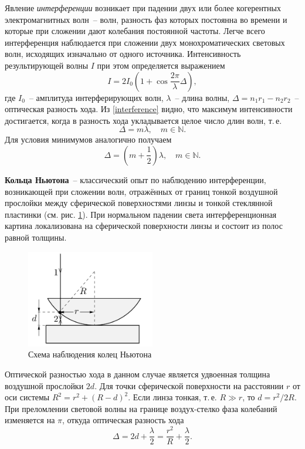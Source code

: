 \documentclass[a4paper,12pt]{article} %
\begin{document}
Явление \textit{интерференции} возникает при падении двух или более когерентных электромагнитных волн~-- волн, разность фаз которых постоянна во времени и которые при сложении дают колебания постоянной частоты. Легче всего интерференция наблюдается при сложении двух монохроматических световых волн, исходящих изначально от одного источника. Интенсивность результирующей волны $I$ при этом определяется выражением
\begin{equation} \label{interference}
    I = 2I_0 \left( 1 + \cos \frac{2\pi}{\lambda}\Delta \right),
\end{equation}
где $I_0$~-- амплитуда интерферирующих волн, $\lambda$~-- длина волны, $\Delta = n_1r_1 - n_2r_2$~-- оптическая разность хода. Из \eqref{interference} видно, что максимум интенсивности достигается, когда в разность хода укладывается целое число длин волн, т.\,е.
\begin{equation}\label{maxInt}
    \Delta = m\lambda,\quad m \in \mathbb{N}.
\end{equation}
Для условия минимумов аналогично получаем
\begin{equation}\label{minInt}
    \Delta = (m + \frac{1}{2})\lambda,\quad m \in \mathbb{N}.
\end{equation}

\textbf{Кольца Ньютона}~-- классический опыт по наблюдению интерференции, возникающей при сложении волн, отражённых от границ тонкой воздушной прослойки между сферической поверхностями линзы и тонкой стеклянной пластинки (см. рис. \ref{NewtonRings}). При нормальном падении света интерференционная картина локализована на сферической поверхности линзы и состоит из полос равной толщины.
\begin{figure}[h]
    \centering
    \includegraphics[width=0.5\textwidth]{NewtonRings.png}
    \caption{Схема наблюдения колец Ньютона}
    \label{NewtonRings}
\end{figure}
Оптической разностью хода в данном случае является удвоенная толщина воздушной прослойки $2d$. Для точки сферической поверхности на расстоянии $r$ от оси системы $R^2 = r^2 + (R - d)^2$. Если линза тонкая, т.\,е. $R\gg r$, то $d = r^2/2R$. При преломлении световой волны на границе воздух-стелко фаза колебаний изменяется на $\pi$, откуда оптическая разность хода
\begin{equation}\label{strokeDiff}
    \Delta = 2d + \frac{\lambda}{2} = \frac{r^2}{R} + \frac{\lambda}{2}.
\end{equation}
\end{document}
